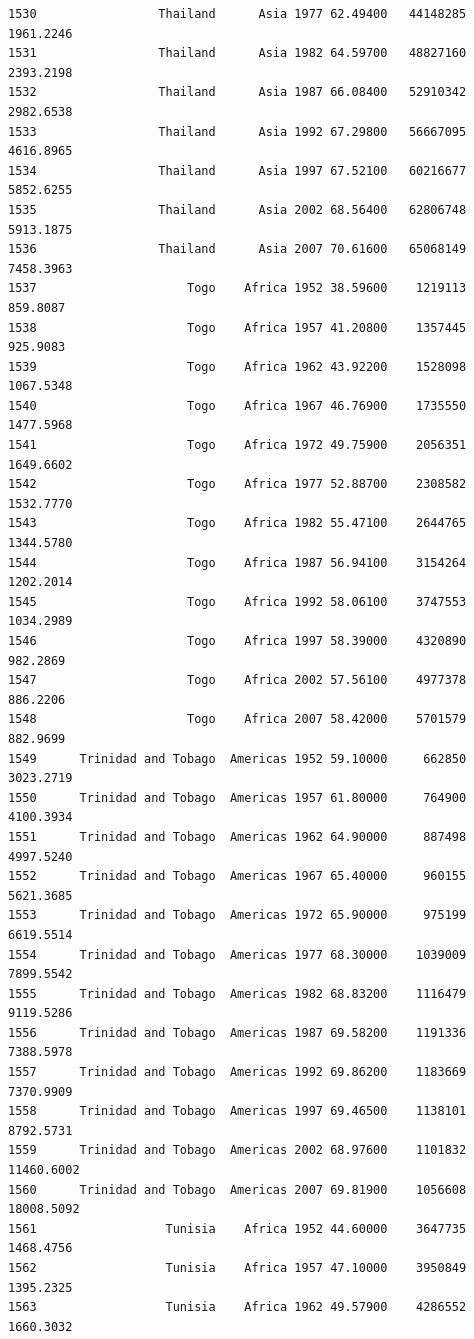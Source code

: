 \documentclass[
  letterpaper,
  DIV=11,
  numbers=noendperiod]{scrreprt}
\begin{document}
\begin{verbatim}
1530                 Thailand      Asia 1977 62.49400   44148285   1961.2246
1531                 Thailand      Asia 1982 64.59700   48827160   2393.2198
1532                 Thailand      Asia 1987 66.08400   52910342   2982.6538
1533                 Thailand      Asia 1992 67.29800   56667095   4616.8965
1534                 Thailand      Asia 1997 67.52100   60216677   5852.6255
1535                 Thailand      Asia 2002 68.56400   62806748   5913.1875
1536                 Thailand      Asia 2007 70.61600   65068149   7458.3963
1537                     Togo    Africa 1952 38.59600    1219113    859.8087
1538                     Togo    Africa 1957 41.20800    1357445    925.9083
1539                     Togo    Africa 1962 43.92200    1528098   1067.5348
1540                     Togo    Africa 1967 46.76900    1735550   1477.5968
1541                     Togo    Africa 1972 49.75900    2056351   1649.6602
1542                     Togo    Africa 1977 52.88700    2308582   1532.7770
1543                     Togo    Africa 1982 55.47100    2644765   1344.5780
1544                     Togo    Africa 1987 56.94100    3154264   1202.2014
1545                     Togo    Africa 1992 58.06100    3747553   1034.2989
1546                     Togo    Africa 1997 58.39000    4320890    982.2869
1547                     Togo    Africa 2002 57.56100    4977378    886.2206
1548                     Togo    Africa 2007 58.42000    5701579    882.9699
1549      Trinidad and Tobago  Americas 1952 59.10000     662850   3023.2719
1550      Trinidad and Tobago  Americas 1957 61.80000     764900   4100.3934
1551      Trinidad and Tobago  Americas 1962 64.90000     887498   4997.5240
1552      Trinidad and Tobago  Americas 1967 65.40000     960155   5621.3685
1553      Trinidad and Tobago  Americas 1972 65.90000     975199   6619.5514
1554      Trinidad and Tobago  Americas 1977 68.30000    1039009   7899.5542
1555      Trinidad and Tobago  Americas 1982 68.83200    1116479   9119.5286
1556      Trinidad and Tobago  Americas 1987 69.58200    1191336   7388.5978
1557      Trinidad and Tobago  Americas 1992 69.86200    1183669   7370.9909
1558      Trinidad and Tobago  Americas 1997 69.46500    1138101   8792.5731
1559      Trinidad and Tobago  Americas 2002 68.97600    1101832  11460.6002
1560      Trinidad and Tobago  Americas 2007 69.81900    1056608  18008.5092
1561                  Tunisia    Africa 1952 44.60000    3647735   1468.4756
1562                  Tunisia    Africa 1957 47.10000    3950849   1395.2325
1563                  Tunisia    Africa 1962 49.57900    4286552   1660.3032

\end{verbatim}
\end{document}
